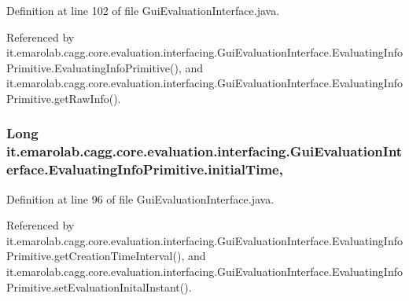 Definition at line 102 of file Gui\-Evaluation\-Interface.\-java.



Referenced by it.\-emarolab.\-cagg.\-core.\-evaluation.\-interfacing.\-Gui\-Evaluation\-Interface.\-Evaluating\-Info\-Primitive.\-Evaluating\-Info\-Primitive(), and it.\-emarolab.\-cagg.\-core.\-evaluation.\-interfacing.\-Gui\-Evaluation\-Interface.\-Evaluating\-Info\-Primitive.\-get\-Raw\-Info().

\hypertarget{classit_1_1emarolab_1_1cagg_1_1core_1_1evaluation_1_1interfacing_1_1GuiEvaluationInterface_1_1EvaluatingInfoPrimitive_ad89465c7a67680c61b0e8818624ba29e}{
\subsubsection[{initial\-Time}]{\setlength{\rightskip}{0pt plus 5cm}Long it.\-emarolab.\-cagg.\-core.\-evaluation.\-interfacing.\-Gui\-Evaluation\-Interface.\-Evaluating\-Info\-Primitive.\-initial\-Time\hspace{0.3cm}{\ttfamily [static]}, {\ttfamily [private]}}}\label{classit_1_1emarolab_1_1cagg_1_1core_1_1evaluation_1_1interfacing_1_1GuiEvaluationInterface_1_1EvaluatingInfoPrimitive_ad89465c7a67680c61b0e8818624ba29e}


Definition at line 96 of file Gui\-Evaluation\-Interface.\-java.



Referenced by it.\-emarolab.\-cagg.\-core.\-evaluation.\-interfacing.\-Gui\-Evaluation\-Interface.\-Evaluating\-Info\-Primitive.\-get\-Creation\-Time\-Interval(), and it.\-emarolab.\-cagg.\-core.\-evaluation.\-interfacing.\-Gui\-Evaluation\-Interface.\-Evaluating\-Info\-Primitive.\-set\-Evaluation\-Inital\-Instant().

